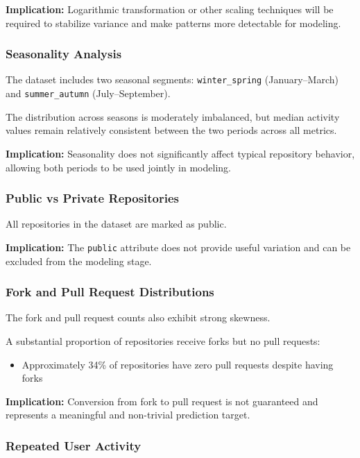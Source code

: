 \textbf{Implication:} Logarithmic transformation or other scaling techniques will be required to stabilize variance and make patterns more detectable for modeling.

\subsubsection{Seasonality Analysis}

The dataset includes two seasonal segments: \texttt{winter\_spring} (January–March) and \texttt{summer\_autumn} (July–September).

The distribution across seasons is moderately imbalanced, but median activity values remain relatively consistent between the two periods across all metrics.

\textbf{Implication:} Seasonality does not significantly affect typical repository behavior, allowing both periods to be used jointly in modeling.

\subsubsection{Public vs Private Repositories}

All repositories in the dataset are marked as public.

\textbf{Implication:} The \texttt{public} attribute does not provide useful variation and can be excluded from the modeling stage.

\subsubsection{Fork and Pull Request Distributions}

The fork and pull request counts also exhibit strong skewness.

A substantial proportion of repositories receive forks but no pull requests:
\begin{itemize}
    \item Approximately 34\% of repositories have zero pull requests despite having forks
\end{itemize}

\textbf{Implication:} Conversion from fork to pull request is not guaranteed and represents a meaningful and non-trivial prediction target.

\subsubsection{Repeated User Activity}

